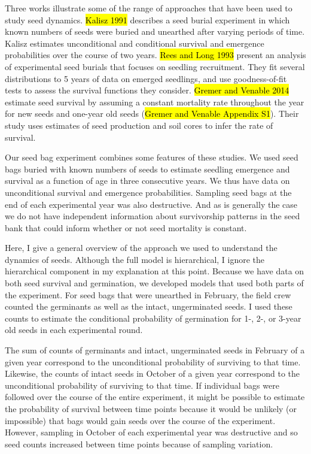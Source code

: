 \documentclass[12pt, oneside, titlepage]{article}   	%
\begin{document}
Three works illustrate some of the range of approaches that have been used to study seed dynamics. \hl{Kalisz 1991} describes a seed burial experiment in which known numbers of seeds were buried and unearthed after varying periods of time. Kalisz estimates unconditional and conditional survival and emergence probabilities over the course of two years. \hl{Rees and Long 1993} present an analysis of experimental seed burials that focuses on seedling recruitment. They fit several distributions to 5 years of data on emerged seedlings, and use goodness-of-fit tests to assess the survival functions they consider. \hl{Gremer and Venable 2014} estimate seed survival by assuming a constant mortality rate throughout the year for new seeds and one-year old seeds (\hl{Gremer and Venable Appendix S1}). Their study uses estimates of seed production and soil cores to infer the rate of survival.

Our seed bag experiment combines some features of these studies. We used seed bags buried with known numbers of seeds to estimate seedling emergence and survival as a function of age in three consecutive years. We thus have data on unconditional survival and emergence probabilities. Sampling seed bags at the end of each experimental year was also destructive. And as is generally the case we do not have independent information about survivorship patterns in the seed bank that could inform whether or not seed mortality is constant.    

Here, I give a general overview of the approach we used to understand the dynamics of seeds. Although the full model is hierarchical, I ignore the hierarchical component in my explanation at this point. Because we have data on both seed survival and germination, we developed models that used both parts of the experiment. For seed bags that were unearthed in February, the field crew counted the germinants as well as the intact, ungerminated seeds. I used these counts to estimate the conditional probability of germination for 1-, 2-, or 3-year old seeds in each experimental round. 

The sum of counts of germinants and intact, ungerminated seeds in February of a given year correspond to the unconditional probability of surviving to that time. Likewise, the counts of intact seeds in October of a given year correspond to the unconditional probability of surviving to that time. If individual bags were followed over the course of the entire experiment, it might be possible to estimate the probability of survival between time points because it would be unlikely (or impossible) that bags would gain seeds over the course of the experiment. However, sampling in October of each experimental year was destructive and so seed counts increased between time points because of sampling variation. 
\end{document}
